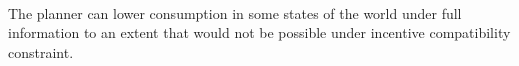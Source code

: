 \documentclass[11pt]{article}
\makeatletter
\newcommand{\boxspacing}{\kern\kvtcb@left@rule\kern\kvtcb@boxsep}
\newcommand{\prompt}[4]{
        \ttfamily\llap{{\color{#2}[#3]:\hspace{3pt}#4}}\vspace{-\baselineskip}
    }
\makeatother
\begin{document}
    \begin{center}
    \end{center}
    { \hspace*{\fill} \\}
    
    The planner can lower consumption in some states of the world under full
information to an extent that would not be possible under incentive
compatibility constraint.

    \begin{tcolorbox}[breakable, size=fbox, boxrule=1pt, pad at break*=1mm,colback=cellbackground, colframe=cellborder]
\prompt{In}{incolor}{ }{\boxspacing}
\begin{Verbatim}[commandchars=\\\{\}]

\end{Verbatim}
\end{tcolorbox}


    
    
    
\end{document}
